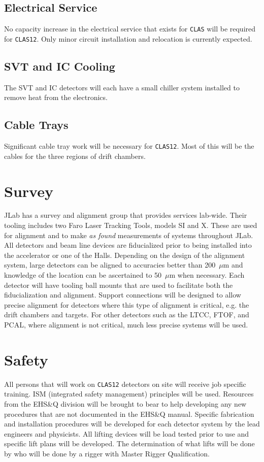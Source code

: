 \subsection{Electrical Service}

No capacity increase in the electrical service that exists for {\tt CLAS}
will be required for {\tt CLAS12}.  Only minor circuit installation and 
relocation is currently expected. 

\subsection{SVT and IC Cooling}

The SVT and IC detectors will each have a small chiller system installed 
to remove heat from the electronics.

\subsection{Cable Trays}

Significant cable tray work will be necessary for {\tt CLAS12}. Most of 
this will be the cables for the three regions of drift chambers. 

\section{Survey}

JLab has a survey and alignment group that provides services lab-wide.
Their tooling includes two Faro Laser Tracking Tools, models SI and X.
These are used for alignment and to make {\it as found} measurements of
systems throughout JLab. All detectors and beam line devices are
fiducialized prior to being installed into the accelerator or one of
the Halls.  Depending on the design of the alignment system, large
detectors can be aligned to accuracies better than 200~$\mu$m and 
knowledge of the location can be ascertained to 50~$\mu$m when necessary. 
Each detector will have tooling ball mounts that are used to facilitate 
both the fiducialization and alignment. Support connections will be 
designed to allow precise alignment for detectors where this type of 
alignment is critical, e.g. the drift chambers and targets.  For other 
detectors such as the LTCC, FTOF, and PCAL, where alignment is not
critical, much less precise systems will be used.

\section{Safety}

All persons that will work on {\tt CLAS12} detectors on site will receive 
job specific training. ISM (integrated safety management) principles will 
be used. Resources from the EHS\&Q division will be brought to bear to help 
developing any new procedures that are not documented in the EHS\&Q manual. 
Specific fabrication and installation procedures will be developed for each 
detector system by the lead engineers and physicists. All lifting devices 
will be load tested prior to use and specific lift plans will be developed. 
The determination of what lifts will be done by who will be done by a rigger 
with Master Rigger Qualification. 
